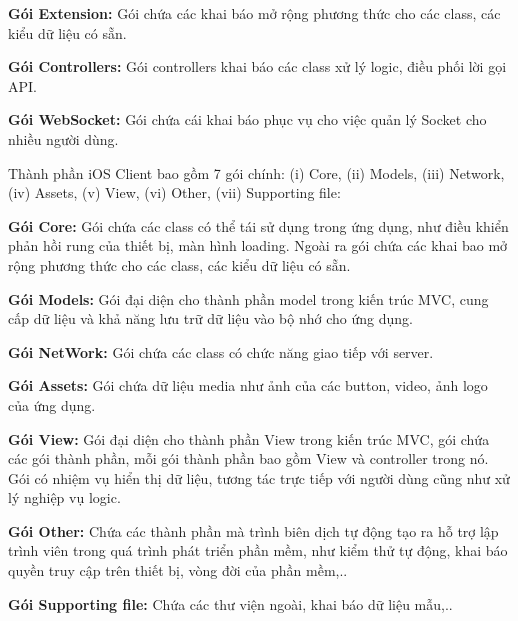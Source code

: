 \documentclass[../DoAn.tex]{subfiles}
\begin{document}
\textbf{Gói Extension:} Gói chứa các khai báo mở rộng phương thức cho các class, các kiểu dữ liệu có sẵn.

\textbf{Gói Controllers:} Gói controllers khai báo các class xử lý logic, điều phối lời gọi API.

\textbf{Gói WebSocket:} Gói chứa cái khai báo phục vụ cho việc quản lý Socket cho nhiều người dùng.

Thành phần iOS Client bao gồm 7 gói chính: (i) Core, (ii) Models, (iii) Network, (iv) Assets, (v) View, (vi) Other, (vii) Supporting file: 

\textbf{Gói Core:} Gói chứa các class có thể tái sử dụng trong ứng dụng, như điều khiển phản hồi rung của thiết bị, màn hình loading. Ngoài ra gói chứa các khai bao mở rộng phương thức cho các class, các kiểu dữ liệu có sẵn.

\textbf{Gói Models:} Gói đại diện cho thành phần model trong kiến trúc MVC, cung cấp dữ liệu và khả năng lưu trữ dữ liệu vào bộ nhớ cho ứng dụng.

\textbf{Gói NetWork:} Gói chứa các class có chức năng giao tiếp với server.

\textbf{Gói Assets:} Gói chứa dữ liệu media như ảnh của các button, video, ảnh logo của ứng dụng.

\textbf{Gói View:} Gói đại diện cho thành phần View trong kiến trúc MVC, gói chứa các gói thành phần, mỗi gói thành phần bao gồm View và controller trong nó. Gói có nhiệm vụ hiển thị dữ liệu, tương tác trực tiếp với người dùng cũng như xử lý nghiệp vụ logic.

\textbf{Gói Other:} Chứa các thành phần mà trình biên dịch tự động tạo ra hỗ trợ lập trình viên trong quá trình phát triển phần mềm, như kiểm thử tự động, khai báo quyền truy cập trên thiết bị, vòng đời của phần mềm,..

\textbf{Gói Supporting file:} Chứa các thư viện ngoài, khai báo dữ liệu mẫu,..
\end{document}
